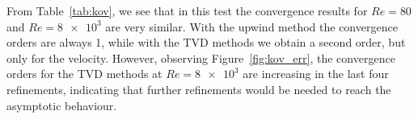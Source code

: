 From Table~\ref{tab:kov}, we see that in this test 
the convergence results for $Re=80$ and $Re=\num{8e3}$ are very similar. With 
the upwind method the convergence orders are always 1, while with the TVD 
methods we obtain a second order, but only for the velocity. However, observing 
Figure~\ref{fig:kov_err}, the convergence orders for the TVD methods at 
$Re=\num{8e3}$ are increasing in the last four refinements, indicating that further refinements would be needed to reach the asymptotic behaviour.
%
